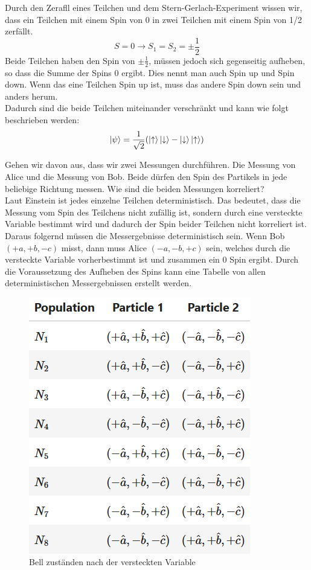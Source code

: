 Durch den Zerafll eines Teilchen und dem Stern-Gerlach-Experiment wissen wir, dass ein Teilchen mit einem Spin von 0 in zwei Teilchen mit einem Spin von 1/2 zerfällt.
\begin{equation}
    S = 0 \rightarrow S_1 = S_2 = \pm\frac{1}{2}
\end{equation}
Beide Teilchen haben den Spin von $\pm\frac{1}{2}$, müssen jedoch sich gegenseitig aufheben, so dass die Summe der Spins 0 ergibt.
Dies nennt man auch Spin up und Spin down. Wenn das eine Teilchen Spin up ist, muss das andere Spin down sein und anders herum.\\
Dadurch sind die beide Teilchen miteinander verschränkt und kann wie folgt beschrieben werden:
\begin{equation}
    \ket{\psi} = \frac{1}{\sqrt{2}}(\ket{\uparrow}\ket{\downarrow} - \ket{\downarrow}\ket{\uparrow})
\end{equation}

Gehen wir davon aus, dass wir zwei Messungen durchführen. Die Messung von Alice und die Messung von Bob.
Beide dürfen den Spin des Partikels in jede beliebige Richtung messen. Wie sind die beiden Messungen korreliert?\\
Laut Einstein ist jedes einzelne Teilchen deterministisch. Das bedeutet, dass die Messung vom Spin des Teilchens nicht zufällig ist, sondern durch eine versteckte Variable bestimmt wird und dadurch der Spin beider Teilchen nicht korreliert ist.\\
Daraus folgernd müssen die Messergebnisse deterministisch sein. Wenn Bob $(+a, +b, -c)$ misst, dann muss Alice $(-a, -b, +c)$ sein, welches durch die versteckte Variable vorherbestimmt ist und zusammen ein 0 Spin ergibt.
Durch die Voraussetzung des Aufheben des Spins kann eine Tabelle von allen deterministischen Messergebnissen erstellt werden.

\begin{figure}[H]
    \centering
    \includegraphics[width=0.5\linewidth]{img/BellList.png}
    \caption{Bell zuständen nach der versteckten Variable}
    \label{fig:BellList}
\end{figure}

